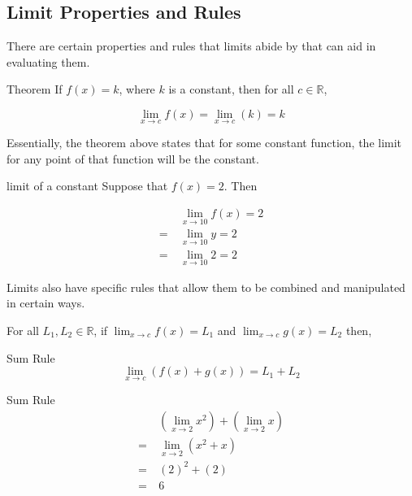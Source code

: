 \subsection{Limit Properties and Rules}

There are certain properties and rules that limits abide by that can aid in evaluating them.

\begin{theorem}{Theorem}
    If \( f \left( x \right) = k \), where \( k \) is a constant, then for all \( c \in \mathbb{R} \),
    
    \[ \lim_{x \to c} f \left( x \right) = \lim_{x \to c} \left( k \right) = k \]
    
    Essentially, the theorem above states that for some constant function, the limit for any point of that function will be the constant.
\end{theorem}

\begin{example}{limit of a constant}
    Suppose that \( f \left( x \right) = 2 \). Then
    
    \begin{align}
        &\lim_{x \to 10} f \left( x \right) = 2 \\
        = \> &\lim_{x \to 10} y = 2 \\
        = \> &\lim_{x \to 10} 2 = 2
    \end{align}
\end{example}

Limits also have specific rules that allow them to be combined and manipulated in certain ways.

For all \( L_1, L_2 \in \mathbb{R} \), if \( \lim_{x \to c} f \left( x \right) = L_1 \) and \( \lim_{x \to c} g \left( x \right) = L_2 \) then,

\begin{definition}{Sum Rule}
    \[ \lim_{x \to c} \left( f \left( x \right) + g \left( x \right) \right) = L_1 + L_2 \]
\end{definition}

\begin{example}{Sum Rule}
    \begin{align}
        &\left( \lim_{x \to 2} x^2 \right) + \left( \lim_{x \to 2} x \right) \\
        = \> &\lim_{x \to 2} \left(x^2 + x \right) \\
        = \> &\left( 2 \right)^2 + \left( 2 \right) \\
        = \> &6
    \end{align}
\end{example}

